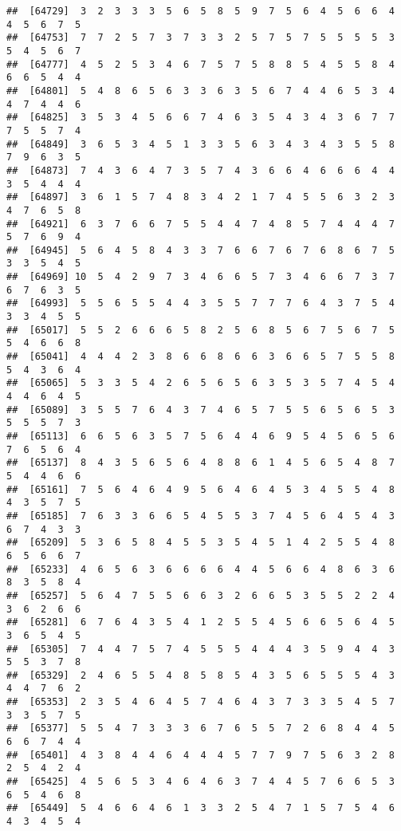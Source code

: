 \documentclass[
]{book}
\begin{document}
\begin{verbatim}
##  [64729]  3  2  3  3  3  5  6  5  8  5  9  7  5  6  4  5  6  6  4  4  5  6  7  5
##  [64753]  7  7  2  5  7  3  7  3  3  2  5  7  5  7  5  5  5  5  3  5  4  5  6  7
##  [64777]  4  5  2  5  3  4  6  7  5  7  5  8  8  5  4  5  5  8  4  6  6  5  4  4
##  [64801]  5  4  8  6  5  6  3  3  6  3  5  6  7  4  4  6  5  3  4  4  7  4  4  6
##  [64825]  3  5  3  4  5  6  6  7  4  6  3  5  4  3  4  3  6  7  7  7  5  5  7  4
##  [64849]  3  6  5  3  4  5  1  3  3  5  6  3  4  3  4  3  5  5  8  7  9  6  3  5
##  [64873]  7  4  3  6  4  7  3  5  7  4  3  6  6  4  6  6  6  4  4  3  5  4  4  4
##  [64897]  3  6  1  5  7  4  8  3  4  2  1  7  4  5  5  6  3  2  3  4  7  6  5  8
##  [64921]  6  3  7  6  6  7  5  5  4  4  7  4  8  5  7  4  4  4  7  5  7  6  9  4
##  [64945]  5  6  4  5  8  4  3  3  7  6  6  7  6  7  6  8  6  7  5  3  3  5  4  5
##  [64969] 10  5  4  2  9  7  3  4  6  6  5  7  3  4  6  6  7  3  7  6  7  6  3  5
##  [64993]  5  5  6  5  5  4  4  3  5  5  7  7  7  6  4  3  7  5  4  3  3  4  5  5
##  [65017]  5  5  2  6  6  6  5  8  2  5  6  8  5  6  7  5  6  7  5  5  4  6  6  8
##  [65041]  4  4  4  2  3  8  6  6  8  6  6  3  6  6  5  7  5  5  8  5  4  3  6  4
##  [65065]  5  3  3  5  4  2  6  5  6  5  6  3  5  3  5  7  4  5  4  4  4  6  4  5
##  [65089]  3  5  5  7  6  4  3  7  4  6  5  7  5  5  6  5  6  5  3  5  5  5  7  3
##  [65113]  6  6  5  6  3  5  7  5  6  4  4  6  9  5  4  5  6  5  6  7  6  5  6  4
##  [65137]  8  4  3  5  6  5  6  4  8  8  6  1  4  5  6  5  4  8  7  5  4  4  6  6
##  [65161]  7  5  6  4  6  4  9  5  6  4  6  4  5  3  4  5  5  4  8  4  3  5  7  5
##  [65185]  7  6  3  3  6  6  5  4  5  5  3  7  4  5  6  4  5  4  3  6  7  4  3  3
##  [65209]  5  3  6  5  8  4  5  5  3  5  4  5  1  4  2  5  5  4  8  6  5  6  6  7
##  [65233]  4  6  5  6  3  6  6  6  6  4  4  5  6  6  4  8  6  3  6  8  3  5  8  4
##  [65257]  5  6  4  7  5  5  6  6  3  2  6  6  5  3  5  5  2  2  4  3  6  2  6  6
##  [65281]  6  7  6  4  3  5  4  1  2  5  5  4  5  6  6  5  6  4  5  3  6  5  4  5
##  [65305]  7  4  4  7  5  7  4  5  5  5  4  4  4  3  5  9  4  4  3  5  5  3  7  8
##  [65329]  2  4  6  5  5  4  8  5  8  5  4  3  5  6  5  5  5  4  3  4  4  7  6  2
##  [65353]  2  3  5  4  6  4  5  7  4  6  4  3  7  3  3  5  4  5  7  3  3  5  7  5
##  [65377]  5  5  4  7  3  3  3  6  7  6  5  5  7  2  6  8  4  4  5  6  6  7  4  4
##  [65401]  4  3  8  4  4  6  4  4  4  5  7  7  9  7  5  6  3  2  8  2  5  4  2  4
##  [65425]  4  5  6  5  3  4  6  4  6  3  7  4  4  5  7  6  6  5  3  6  5  4  6  8
##  [65449]  5  4  6  6  4  6  1  3  3  2  5  4  7  1  5  7  5  4  6  4  3  4  5  4

\end{verbatim}
\end{document}
